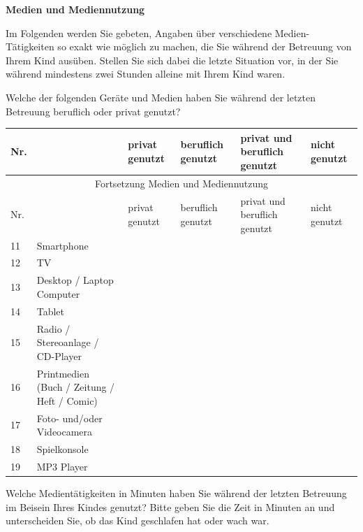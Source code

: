\begin{flushleft}
\begin{longtable}[c]{ |p{1em}|p{16em}|p{16em}| }
\end{longtable}

\bigskip
\textbf{Medien und Mediennutzung}

Im Folgenden werden Sie gebeten, Angaben über verschiedene Medien-Tätigkeiten so exakt wie möglich zu machen, die Sie während der Betreuung von Ihrem Kind ausüben. Stellen Sie sich dabei die letzte Situation vor, in der Sie während mindestens zwei Stunden alleine mit Ihrem Kind waren.

\vspace{2mm}
Welche der folgenden Geräte und Medien haben Sie während der letzten Betreuung beruflich oder privat genutzt?

\begin{longtable}[c]{ |p{1em}|p{12em}|p{4em}|p{4em}|p{4em}|p{4em}|}
 
  \hline
  Nr. &  & privat genutzt & beruflich genutzt & privat und beruflich genutzt & nicht genutzt \\
  \hline
  \endfirsthead
 
  \hline
  \multicolumn{6}{|c|}{ Fortsetzung Medien und Mediennutzung}\\
  \hline
  Nr. &  & privat genutzt & beruflich genutzt & privat und beruflich genutzt & nicht genutzt \\
  \hline
  \endhead
 
  \hline
  \endfoot
 
  \hline\hline
  \endlastfoot
  
  
  11 & Smartphone &  &  &  &  \\
  12 & TV &  &  &  &  \\
  13 & Desktop / Laptop Computer &  &  &  &  \\
  14 & Tablet &  &  &  &  \\
  15 & Radio / Stereoanlage / CD-Player &  &  &  &  \\
  16 & Printmedien (Buch / Zeitung / Heft / Comic) &  &  &  &  \\
  17 & Foto- und/oder Videocamera &  &  &  &  \\
  18 & Spielkonsole &  &  &  &  \\
  19 & MP3 Player &  &  &  &  \\
  
\end{longtable}

Welche Medientätigkeiten in Minuten haben Sie während der letzten Betreuung im Beisein Ihres Kindes genutzt? Bitte geben Sie die Zeit in Minuten an und unterscheiden Sie, ob das Kind geschlafen hat oder wach war.


\end{flushleft}
